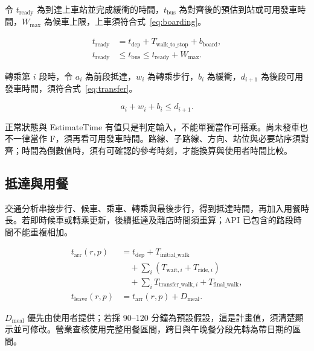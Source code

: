 令 \(t_{\mathrm{ready}}\) 為到達上車站並完成緩衝的時間，\(t_{\mathrm{bus}}\) 為對齊後的預估到站或可用發車時間，\(W_{\max}\) 為候車上限，上車須符合式~\ref{eq:boarding}。

\begin{equation}\label{eq:boarding}
\begin{aligned}
t_{\mathrm{ready}} &= t_{\mathrm{dep}}+T_{\mathrm{walk\_to\_stop}}+b_{\mathrm{board}},\\
t_{\mathrm{ready}} &\leq t_{\mathrm{bus}}\leq t_{\mathrm{ready}}+W_{\max}.
\end{aligned}
\end{equation}

轉乘第 \(i\) 段時，令 \(a_i\) 為前段抵達，\(w_i\) 為轉乘步行，\(b_i\) 為緩衝，\(d_{i+1}\) 為後段可用發車時間，須符合式~\ref{eq:transfer}。

\begin{equation}\label{eq:transfer}
a_i+w_i+b_i\leq d_{i+1}.
\end{equation}

正常狀態與 EstimateTime 有值只是判定輸入，不能單獨當作可搭乘。尚未發車也不一律當作 F，須再看可用發車時間。路線、子路線、方向、站位與必要站序須對齊；時間為倒數值時，須有可確認的參考時刻，才能換算與使用者時間比較。

\subsection{抵達與用餐}

交通分析串接步行、候車、乘車、轉乘與最後步行，得到抵達時間，再加入用餐時長。若即時候車或轉乘更新，後續抵達及離店時間須重算；API 已包含的路段時間不能重複相加。

\begin{equation}\label{eq:timeline}
\begin{aligned}
t_{\mathrm{arr}}(r,p) &= t_{\mathrm{dep}}+T_{\mathrm{initial\_walk}}\\
 &\quad+\sum_i(T_{\mathrm{wait},i}+T_{\mathrm{ride},i})\\
 &\quad+\sum_iT_{\mathrm{transfer\_walk},i}+T_{\mathrm{final\_walk}},\\
t_{\mathrm{leave}}(r,p) &= t_{\mathrm{arr}}(r,p)+D_{\mathrm{meal}}.
\end{aligned}
\end{equation}

\(D_{\mathrm{meal}}\) 優先由使用者提供；若採 90–120 分鐘為預設假設，這是計畫值，須清楚顯示並可修改。營業查核使用完整用餐區間，跨日與午晚餐分段先轉為帶日期的區間。

